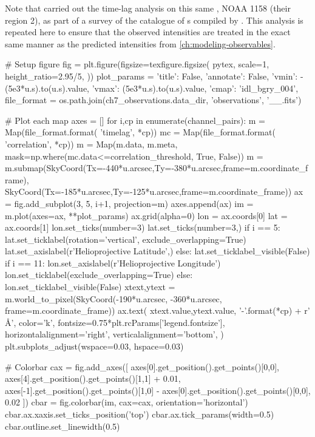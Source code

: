 Note that \citet{viall_survey_2017} carried out the time-lag analysis on this same \AR{}, NOAA 1158 (their region 2), as part of a survey of the catalogue of \AR{}s compiled by \citet{warren_systematic_2012}. This analysis is repeated here to ensure that the observed intensities are treated in the exact same manner as the predicted intensities from \autoref{ch:modeling-observables}.

\begin{pycode}
# Setup figure
fig = plt.figure(figsize=texfigure.figsize(
    pytex,
    scale=1,
    height_ratio=2.95/5,
))
plot_params = {
    'title': False, 
    'annotate': False,
    'vmin': -(5e3*u.s).to(u.s).value,
    'vmax': (5e3*u.s).to(u.s).value,
    'cmap': 'idl_bgry_004',
}
file_format = os.path.join(ch7_observations.data_dir, 'observations', '{}_{}_{}.fits')

# Plot each map
axes = []
for i,cp in enumerate(channel_pairs):
    m = Map(file_format.format( 'timelag', *cp))
    mc = Map(file_format.format( 'correlation', *cp))
    m = Map(m.data, m.meta, mask=np.where(mc.data<=correlation_threshold, True, False))
    m = m.submap(SkyCoord(Tx=-440*u.arcsec,Ty=-380*u.arcsec,frame=m.coordinate_frame),
                 SkyCoord(Tx=-185*u.arcsec,Ty=-125*u.arcsec,frame=m.coordinate_frame))
    ax = fig.add_subplot(3, 5, i+1, projection=m)
    axes.append(ax)
    im = m.plot(axes=ax, **plot_params)
    ax.grid(alpha=0)
    lon = ax.coords[0]
    lat = ax.coords[1]
    lon.set_ticks(number=3)
    lat.set_ticks(number=3,) 
    if i == 5:
        lat.set_ticklabel(rotation='vertical', exclude_overlapping=True)
        lat.set_axislabel(r'Helioprojective Latitude',)
    else:
        lat.set_ticklabel_visible(False)
    if i == 11:
        lon.set_axislabel(r'Helioprojective Longitude')
        lon.set_ticklabel(exclude_overlapping=True)
    else:
        lon.set_ticklabel_visible(False)
    xtext,ytext = m.world_to_pixel(SkyCoord(-190*u.arcsec, -360*u.arcsec, frame=m.coordinate_frame))
    ax.text(
        xtext.value,ytext.value,
        '{}-{}'.format(*cp) + r' \si{\angstrom}',
        color='k',
        fontsize=0.75*plt.rcParams['legend.fontsize'],
        horizontalalignment='right',
        verticalalignment='bottom',
    )
plt.subplots_adjust(wspace=0.03, hspace=0.03)

# Colorbar
cax = fig.add_axes([
    axes[0].get_position().get_points()[0,0],
    axes[4].get_position().get_points()[1,1] + 0.01,
    axes[-1].get_position().get_points()[1,0] - axes[0].get_position().get_points()[0,0], 
    0.02
])
cbar = fig.colorbar(im, cax=cax, orientation='horizontal')
cbar.ax.xaxis.set_ticks_position('top')
cbar.ax.tick_params(width=0.5)
cbar.outline.set_linewidth(0.5)


\end{pycode}
